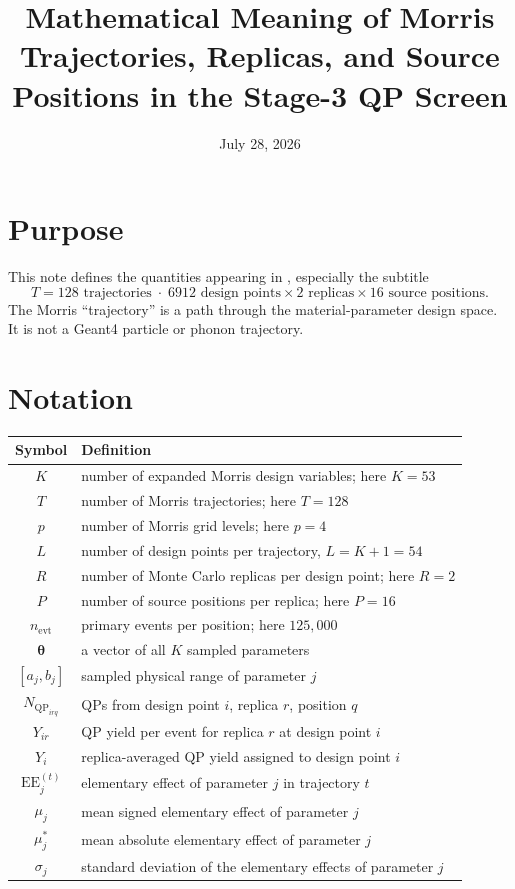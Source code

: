 \documentclass[11pt]{article}
\title{Mathematical Meaning of Morris Trajectories, Replicas, and Source
Positions in the Stage-3 QP Screen}
\author{}
\date{July 28, 2026}
\newcommand{\mustar}{\mu^{\ast}}
\newcommand{\EE}{\mathrm{EE}}
\newcommand{\NQP}{N_{\mathrm{QP}}}
\begin{document}
\maketitle

\section{Purpose}

This note defines the quantities appearing in
, especially the subtitle
\[
T=128\text{ trajectories}\;\cdot\;
6912\text{ design points}\times
2\text{ replicas}\times
16\text{ source positions}.
\]
The Morris ``trajectory'' is a path through the material-parameter design
space.  It is not a Geant4 particle or phonon trajectory.

\section{Notation}

\begin{table}[ht]
\centering
\begin{tabular}{@{}cl@{}}
\toprule
Symbol & Definition \\
\midrule
$K$ & number of expanded Morris design variables; here $K=53$ \\
$T$ & number of Morris trajectories; here $T=128$ \\
$p$ & number of Morris grid levels; here $p=4$ \\
$L$ & number of design points per trajectory, $L=K+1=54$ \\
$R$ & number of Monte Carlo replicas per design point; here $R=2$ \\
$P$ & number of source positions per replica; here $P=16$ \\
$n_{\mathrm{evt}}$ & primary events per position; here $125{,}000$ \\
$\boldsymbol{\theta}$ & a vector of all $K$ sampled parameters \\
$[a_j,b_j]$ & sampled physical range of parameter $j$ \\
$\NQP_{i r q}$ & QPs from design point $i$, replica $r$, position $q$ \\
$Y_{ir}$ & QP yield per event for replica $r$ at design point $i$ \\
$Y_i$ & replica-averaged QP yield assigned to design point $i$ \\
$\EE_j^{(t)}$ & elementary effect of parameter $j$ in trajectory $t$ \\
$\mu_j$ & mean signed elementary effect of parameter $j$ \\
$\mustar_j$ & mean absolute elementary effect of parameter $j$ \\
$\sigma_j$ & standard deviation of the elementary effects of parameter $j$ \\
\bottomrule
\end{tabular}
\end{table}
\end{document}
